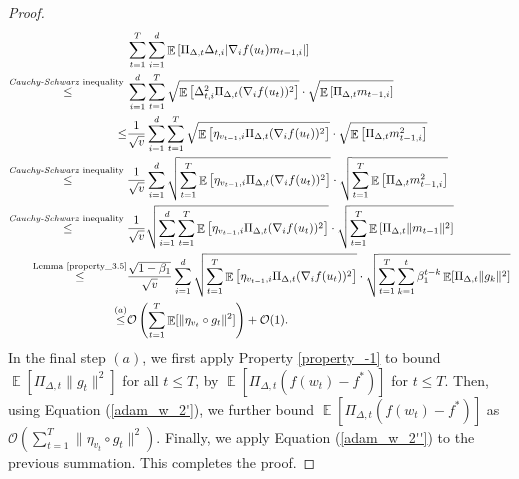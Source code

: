 \documentclass{article} %
\DeclareMathOperator{\Expect}{\mathbb{E}}
\begin{document}
\begin{proof}
\begin{align*}
&\sum_{t=1}^{T}\sum_{i=1}^{d}\Expect\left[\Pi_{\Delta,t}\Delta_{t,i}|\nabla_{i} f(u_{t})m_{t-1,i}|\right]\\\mathop{\le}^{\text{\emph{Cauchy-Schwarz} inequality }}&  \sum_{i=1}^{d}\sum_{t=1}^{T}\sqrt{\Expect\left[\Delta^{2}_{t,i}\Pi_{\Delta,t}(\nabla_{i} f(u_{t}))^{2}\right]}\cdot\sqrt{\Expect\left[\Pi_{\Delta,t}{m_{t-1,i}}  \right] }\\\le& \frac{1}{\sqrt{v}}\sum_{i=1}^{d}\sum_{t=1}^{T}\sqrt{\Expect\left[\eta_{v_{t-1},i}\Pi_{\Delta,t}(\nabla_{i} f(u_{t}))^{2}\right]}\cdot\sqrt{\Expect\left[\Pi_{\Delta,t}{m^{2}_{t-1,i}}  \right] }\\\mathop{\le}^{\text{\emph{Cauchy-Schwarz} inequality }}&  \frac{1}{\sqrt{v}}\sum_{i=1}^{d}\sqrt{\sum_{t=1}^{T}\Expect\left[\eta_{v_{t-1},i}\Pi_{\Delta,t}(\nabla_{i} f(u_{t}))^{2}\right]}\cdot\sqrt{\sum_{t=1}^{T}\Expect\left[\Pi_{\Delta,t}m^{2}_{t-1,i}\right]}\\\mathop{\le}^{\text{\emph{Cauchy-Schwarz} inequality }}&  \frac{1}{\sqrt{v}}\sqrt{\sum_{i=1}^{d}\sum_{t=1}^{T}\Expect\left[\eta_{v_{t-1},i}\Pi_{\Delta,t}(\nabla_{i} f(u_{t}))^{2}\right]}\cdot\sqrt{\sum_{t=1}^{T}\Expect\left[\Pi_{\Delta,t}\|m_{t-1}\|^2\right]}  \\\mathop{\le}^{\text{Lemma \ref{property_3.5}}}&\frac{\sqrt{1-\beta_{1}}}{\sqrt{v}}\sum_{i=1}^{d}\sqrt{\sum_{t=1}^{T}\Expect\left[\eta_{v_{t-1},i}\Pi_{\Delta,t}(\nabla_{i} f(u_{t}))^{2}\right]}\cdot\sqrt{\sum_{t=1}^{T}\sum_{k=1}^{t}\beta_{1}^{t-k}\Expect[\Pi_{\Delta,t}\|g_{k}\|^{2}]}\\\mathop{\le}^{(a)}&\mathcal{O}\left(\sum_{t=1}^{T}\Expect[\|\eta_{v_{t}}\circ g_{t}\|^{2}]\right)+\mathcal{O}(1).
\end{align*}
In the final step \((a)\), we first apply Property \ref{property_-1} to bound \(\Expect[\Pi_{\Delta,t}\|g_{t}\|^{2}]\) for all \( t \leq T \), by \(\Expect[\Pi_{\Delta,t}(f(w_{t}) - f^*)]\) for \( t \leq T \). Then, using Equation (\ref{adam_w_2'}), we further bound \(\Expect[\Pi_{\Delta,t}(f(w_{t}) - f^*)]\) as \(\mathcal{O}\left(\sum_{t=1}^{T} \|\eta_{v_{t}} \circ g_{t}\|^{2}\right)\). Finally, we apply Equation (\ref{adam_w_2''}) to the previous summation. This completes the proof.
\end{proof}
\end{document}
